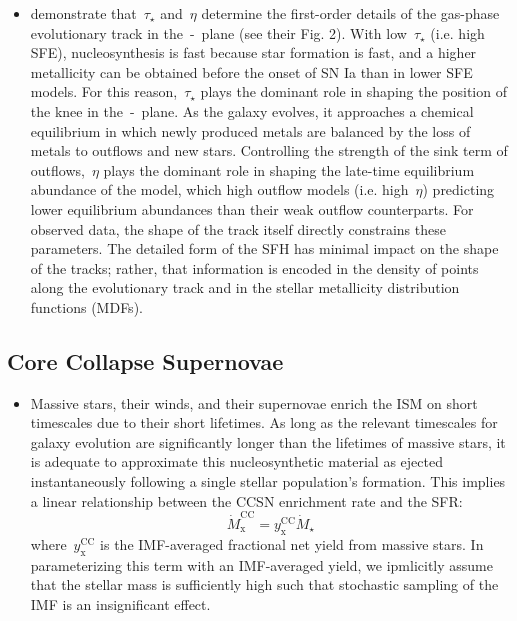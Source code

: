 \documentclass[ms.tex]{subfiles}
\begin{document}
\begin{itemize}
\begin{itemize}
		\item \citet{Weinberg2017} demonstrate that~$\tau_\star$ and~$\eta$
		determine the first-order details of the gas-phase evolutionary track
		in the~\afe-\feh~plane (see their Fig. 2).
		With low~$\tau_\star$ (i.e. high SFE), nucleosynthesis is fast because
		star formation is fast, and a higher metallicity can be obtained before
		the onset of SN Ia than in lower SFE models.
		For this reason,~$\tau_\star$ plays the dominant role in shaping the
		position of the knee in the~\afe-\feh~plane.
		As the galaxy evolves, it approaches a chemical equilibrium in which
		newly produced metals are balanced by the loss of metals to outflows
		and new stars.
		Controlling the strength of the sink term of outflows,~$\eta$ plays
		the dominant role in shaping the late-time equilibrium abundance of the
		model, which high outflow models (i.e. high~$\eta$) predicting lower
		equilibrium abundances than their weak outflow counterparts.
		For observed data, the shape of the track itself directly constrains
		these parameters.
		The detailed form of the SFH has minimal impact on the shape of the
		tracks; rather, that information is encoded in the density of points
		along the evolutionary track and in the stellar metallicity
		distribution functions (MDFs).

	\end{itemize}

\end{itemize}

\subsection{Core Collapse Supernovae}
\label{sec:onezone:ccsne}

\begin{itemize}

	\item Massive stars, their winds, and their supernovae enrich the ISM on
	short timescales due to their short lifetimes.
	As long as the relevant timescales for galaxy evolution are significantly
	longer than the lifetimes of massive stars, it is adequate to approximate
	this nucleosynthetic material as ejected instantaneously following a single
	stellar population's formation.
	This implies a linear relationship between the CCSN enrichment rate and
	the SFR:
	\begin{equation}
	\label{eq:mdot_cc}
	\dot{M}_\text{x}^\text{CC} = y_\text{x}^\text{CC}\dot{M}_\star
	\end{equation}
	where~$y_\text{x}^\text{CC}$ is the IMF-averaged fractional net yield from
	massive stars.
	In parameterizing this term with an IMF-averaged yield, we ipmlicitly assume
	that the stellar mass is sufficiently high such that stochastic sampling of
	the IMF is an insignificant effect.

\end{itemize}
\end{document}
